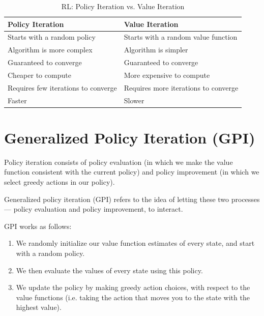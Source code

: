 \begin{table}[h]
    \centering
    \begin{tabular}{|p{6cm}|p{6cm}|}
        \hline
        \textbf{Policy Iteration} & \textbf{Value Iteration} \\
        \hline
        Starts with a random policy & Starts with a random value function \\
        \hline
        Algorithm is more complex & Algorithm is simpler \\
        \hline
        Guaranteed to converge & Guaranteed to converge \\
        \hline
        Cheaper to compute & More expensive to compute \\
        \hline
        Requires few iterations to converge & Requires more iterations to converge \\
        \hline
        Faster & Slower \\
        \hline
    \end{tabular}
    \caption{RL: Policy Iteration vs. Value Iteration}
\end{table}


\section{Generalized Policy Iteration (GPI) \cite{medium/towardsdatascience.com/introduction-to-reinforcement-learning-rl-part-4-dynamic-programming-6af57e575b3d}}\label{Generalized Policy Iteration (GPI)}

Policy iteration consists of policy evaluation (in which we make the value function consistent with the current policy) and policy improvement (in which we select greedy actions in our policy).

Generalized policy iteration (GPI) refers to the idea of letting these two processes — policy evaluation and policy improvement, to interact.

GPI works as follows:
\begin{enumerate}
    \item We randomly initialize our value function estimates of every state, and start with a random policy.

    \item We then evaluate the values of every state using this policy.

    \item We update the policy by making greedy action choices, with respect to the value functions (i.e. taking the action that moves you to the state with the highest value).
\end{enumerate}

